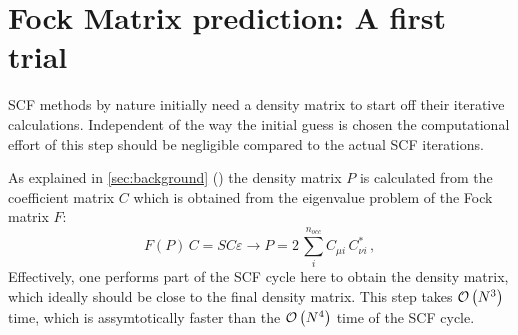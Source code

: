 \chapter{Fock Matrix prediction: A first trial}
\label{chap:fock_matrix_predictions}

SCF methods by nature initially need a density matrix to start off their iterative calculations. Independent of the way the initial guess is chosen the computational effort of this step should be negligible compared to the actual SCF iterations. 

As explained in \autoref{sec:background} () the density matrix $P$ is calculated from the coefficient matrix $C$ which is obtained from the eigenvalue problem of the Fock matrix $F$:
\begin{equation}
    F(P)\,C = SC\varepsilon \rightarrow P = 2\,\sum_{i}^{n_{occ}} C_{\mu i}\,C^*_{\nu i}\,,%
\end{equation}
Effectively, one performs part of the SCF cycle here to obtain the density matrix, which ideally should be close to the final density matrix. This step takes $\mathcal{O}\left(N^3\right)$ time, which is assymtotically faster than the $\mathcal{O}\left(N^4\right)$ time of the SCF cycle. 


